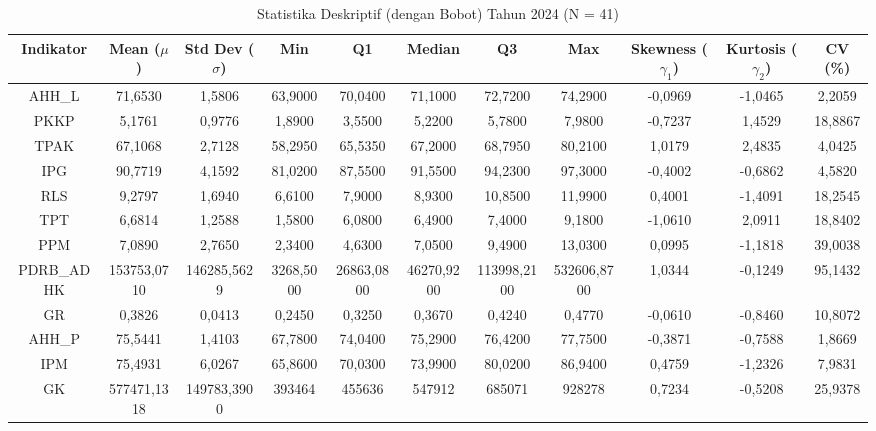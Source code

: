 \begin{table}[H]
\centering
\caption{Statistika Deskriptif (dengan Bobot) Tahun 2024 (N = 41)} \label{tab:app1desc_2024}
\begin{adjustbox}{max width=\textwidth, max height=0.85\textheight}
\begin{tabular}{|c|c|c|c|c|c|c|c|c|c|c|}
\hline
\textbf{Indikator} & \textbf{Mean ($\mu$)} & \textbf{Std Dev ($\sigma$)} & \textbf{Min} & \textbf{Q1} & \textbf{Median} & \textbf{Q3} & \textbf{Max} & \textbf{Skewness ($\gamma_1$)} & \textbf{Kurtosis ($\gamma_2$)} & \textbf{CV (\%)} \\
\hline
AHH\_L & 71,6530 & 1,5806 & 63,9000 & 70,0400 & 71,1000 & 72,7200 & 74,2900 & -0,0969 & -1,0465 & 2,2059 \\
PKKP & 5,1761 & 0,9776 & 1,8900 & 3,5500 & 5,2200 & 5,7800 & 7,9800 & -0,7237 & 1,4529 & 18,8867 \\
TPAK & 67,1068 & 2,7128 & 58,2950 & 65,5350 & 67,2000 & 68,7950 & 80,2100 & 1,0179 & 2,4835 & 4,0425 \\
IPG & 90,7719 & 4,1592 & 81,0200 & 87,5500 & 91,5500 & 94,2300 & 97,3000 & -0,4002 & -0,6862 & 4,5820 \\
RLS & 9,2797 & 1,6940 & 6,6100 & 7,9000 & 8,9300 & 10,8500 & 11,9900 & 0,4001 & -1,4091 & 18,2545 \\
TPT & 6,6814 & 1,2588 & 1,5800 & 6,0800 & 6,4900 & 7,4000 & 9,1800 & -1,0610 & 2,0911 & 18,8402 \\
PPM & 7,0890 & 2,7650 & 2,3400 & 4,6300 & 7,0500 & 9,4900 & 13,0300 & 0,0995 & -1,1818 & 39,0038 \\
PDRB\_ADHK & 153753,0710 & 146285,5629 & 3268,5000 & 26863,0800 & 46270,9200 & 113998,2100 & 532606,8700 & 1,0344 & -0,1249 & 95,1432 \\
GR & 0,3826 & 0,0413 & 0,2450 & 0,3250 & 0,3670 & 0,4240 & 0,4770 & -0,0610 & -0,8460 & 10,8072 \\
AHH\_P & 75,5441 & 1,4103 & 67,7800 & 74,0400 & 75,2900 & 76,4200 & 77,7500 & -0,3871 & -0,7588 & 1,8669 \\
IPM & 75,4931 & 6,0267 & 65,8600 & 70,0300 & 73,9900 & 80,0200 & 86,9400 & 0,4759 & -1,2326 & 7,9831 \\
GK & 577471,1318 & 149783,3900 & 393464 & 455636 & 547912 & 685071 & 928278 & 0,7234 & -0,5208 & 25,9378 \\
\hline
\end{tabular}
\end{adjustbox}
\end{table}